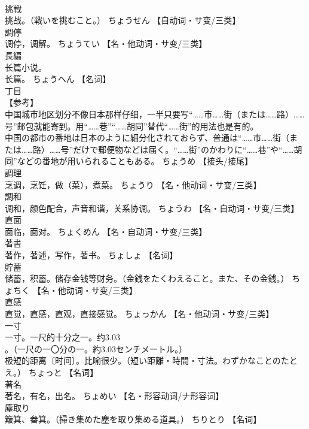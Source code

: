 \documentclass[8pt]{extreport}
\begin{document}
\begin{CJK}{UTF8}{min}
\\	挑戦	
\\	挑战。（戦いを挑むこと。）	ちょうせん		【自动词・サ变/三类】
\\	調停	
\\	调停，调解。	ちょうてい		【名・他动词・サ变/三类】
\\	長編	
\\	长篇小说。 
\\	长篇。	ちょうへん		【名词】
\\	丁目	
\\	【参考】 
\\	中国城市地区划分不像日本那样仔细，一半只要写“……市……街（または……路）……号”邮包就能寄到。用“……巷”“……胡同”替代“……街”的用法也是有的。 
\\	中国の都市の番地は日本のように細分化されておらず、普通は“……市……街（または……路）……号”だけで郵便物などは届く。“……街”のかわりに“……巷”や“……胡同”などの番地が用いられることもある。	ちょうめ		【接头/接尾】
\\	調理	
\\	烹调，烹饪，做（菜），煮菜。	ちょうり		【名・他动词・サ变/三类】
\\	調和	
\\	调和，颜色配合，声音和谐，关系协调。	ちょうわ		【名・自动词・サ变/三类】
\\	直面	
\\	面临，面对。	ちょくめん		【名・自动词・サ变/三类】
\\	著書	
\\	著作，著述，写作，著书。	ちょしょ		【名词】
\\	貯蓄	
\\	储蓄，积蓄。储存金钱等财务。（金銭をたくわえること。また、その金銭。）	ちょちく		【名・他动词・サ变/三类】
\\	直感	
\\	直觉，直感，直观，直接感觉。	ちょっかん		【名・他动词・サ变/三类】
\\	一寸	
\\	一寸。一尺的十分之一。约3.03
\\	。（一尺の一〇分の一。約3.03センチメートル。） 
\\	极短的距离〔时间〕。比喻很少。（短い距離・時間・寸法。わずかなことのたとえ。）	ちょっと		【名词】
\\	著名	
\\	著名，有名，出名。	ちょめい		【名・形容动词/ナ形容词】
\\	塵取り	
\\	簸箕、畚箕。（掃き集めた塵を取り集める道具。）	ちりとり		【名词】

\end{CJK}
\end{document}
